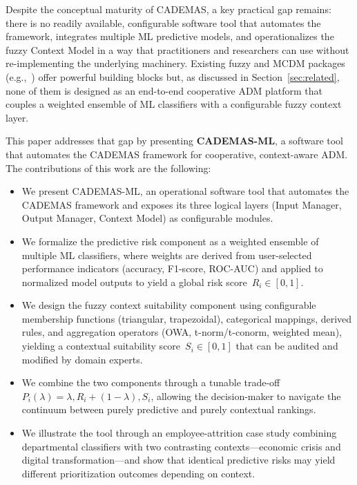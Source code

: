 Despite the conceptual maturity of CADEMAS, a key practical gap remains: there is no
readily available, configurable software tool that automates the framework, integrates multiple
ML predictive models, and operationalizes the fuzzy Context Model in a way that practitioners
and researchers can use without re-implementing the underlying machinery. Existing fuzzy and
MCDM packages (e.g.,\ \citealp{wieckowski2022pyfdm,wieckowski2023pyifdm,
roszkowska2024intuitionisticfuzzy,grazioso2023eligere,dikopoulou2021fcm,chen2020fuzzyr}) offer
powerful building blocks but, as discussed in Section~\ref{sec:related}, none of them is
designed as an end-to-end cooperative ADM platform that couples a weighted ensemble of ML
classifiers with a configurable fuzzy context layer.

This paper addresses that gap by presenting \textbf{CADEMAS-ML}, a software tool that
automates the CADEMAS framework for cooperative, context-aware ADM. The contributions of this
work are the following:

\begin{itemize}
\item We present CADEMAS-ML, an operational software tool that automates the CADEMAS
framework \citep{novoa2026cademas} and exposes its three logical layers (Input Manager,
Output Manager, Context Model) as configurable modules.
\item We formalize the predictive risk component as a weighted ensemble of multiple ML
classifiers, where weights are derived from user-selected performance indicators
(accuracy, F1-score, ROC-AUC) and applied to normalized model outputs to yield a global
risk score~$R_i \in [0,1]$.
\item We design the fuzzy context suitability component using configurable membership
functions (triangular, trapezoidal), categorical mappings, derived rules, and aggregation
operators (OWA, t-norm/t-conorm, weighted mean), yielding a contextual suitability
score~$S_i \in [0,1]$ that can be audited and modified by domain experts.
\item We combine the two components through a tunable trade-off
$P_i(\lambda) = \lambda, R_i + (1-\lambda), S_i$, allowing the decision-maker to
navigate the continuum between purely predictive and purely contextual rankings.
\item We illustrate the tool through an employee-attrition case study
\citep{godz2026attrition} combining departmental classifiers with two contrasting
contexts---economic crisis and digital transformation---and show that identical
predictive risks may yield different prioritization outcomes depending on context.
\end{itemize}

